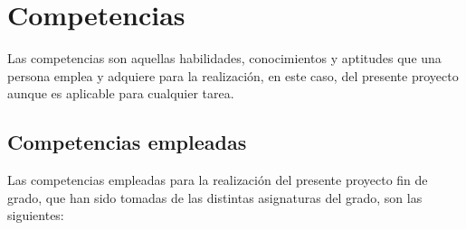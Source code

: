 \section{Competencias}

Las competencias son aquellas habilidades, conocimientos y aptitudes que una persona emplea y adquiere para la realización, en este caso, del presente proyecto aunque es aplicable para cualquier tarea.
   
\subsection{Competencias empleadas}
Las competencias empleadas para la realización del presente proyecto fin de grado, que han sido tomadas de las distintas asignaturas del grado, son las siguientes: 

